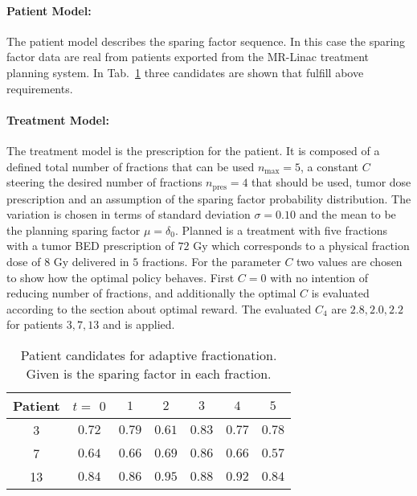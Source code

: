 \documentclass[\relativeRoot/ada.tex]{subfiles}
\begin{document}
\paragraph{Patient Model:} The patient model describes the sparing factor sequence. In this case the sparing factor data are real from patients exported from the MR-Linac treatment planning system. In Tab.~\ref{tab:patient_sparing_factors} three candidates are shown that fulfill above requirements.

\paragraph{Treatment Model:} The treatment model is the prescription for the patient. It is composed of a defined total number of fractions that can be used $n_{\text{max}}=5$, a constant $C$ steering the desired number of fractions $n_{\text{pres}}=4$ that should be used, tumor dose prescription and an assumption of the sparing factor probability distribution. The variation is chosen in terms of standard deviation $\sigma = 0.10$ and the mean to be the planning sparing factor $\mu=\delta_0$. Planned is a treatment with five fractions with a tumor BED prescription of $72$ Gy which corresponds to a physical fraction dose of $8$ Gy delivered in $5$ fractions. For the parameter $C$ two values are chosen to show how the optimal policy behaves. First $C=0$ with no intention of reducing number of fractions, and additionally the optimal $C$ is evaluated according to the section about optimal reward. The evaluated $C_4$ are $2.8, 2.0, 2.2$ for patients $3, 7, 13$ and is applied.

\begin{table}[!htb]
    \centering
    \caption{Patient candidates for adaptive fractionation. Given is the sparing factor in each fraction.}
    \begin{tabular}{c|cccccc}
    \toprule
        Patient & $t=$ $0$ & $1$ & $2$ & $3$ & $4$ & $5$\\
    \midrule
       3    &  $0.72$ & $0.79$ &  $0.61$ & $0.83$ & $0.77$ & $0.78$\\
       7    &  $0.64$ & $0.66$ &  $0.69$ & $0.86$ & $0.66$ & $0.57$ \\
       13   &  $0.84$ & $0.86$ &  $0.95$ & $0.88$ & $0.92$ & $0.84$ \\
     
    \bottomrule
    \end{tabular}
    \label{tab:patient_sparing_factors}
\end{table}
\end{document}
